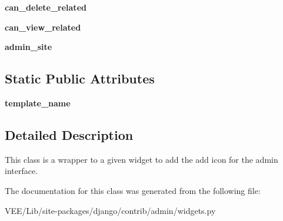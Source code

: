 \begin{DoxyCompactItemize}
{\bfseries can\+\_\+delete\+\_\+related}
\item 
\mbox{\label{classdjango_1_1contrib_1_1admin_1_1widgets_1_1_related_field_widget_wrapper_aa587863cdb1c004aea966f3668b40fe8}} 
{\bfseries can\+\_\+view\+\_\+related}
\item 
\mbox{\label{classdjango_1_1contrib_1_1admin_1_1widgets_1_1_related_field_widget_wrapper_a3b45ba41a9306a1a46a951c618e58e3b}} 
{\bfseries admin\+\_\+site}
\end{DoxyCompactItemize}
\subsection*{Static Public Attributes}
\begin{DoxyCompactItemize}
\item 
\mbox{\label{classdjango_1_1contrib_1_1admin_1_1widgets_1_1_related_field_widget_wrapper_a2dd08f514a692eeb3608c93a8a7a8538}} 
{\bfseries template\+\_\+name}
\end{DoxyCompactItemize}


\subsection{Detailed Description}
\begin{DoxyVerb}This class is a wrapper to a given widget to add the add icon for the
admin interface.
\end{DoxyVerb}
 

The documentation for this class was generated from the following file\+:\begin{DoxyCompactItemize}
\item 
V\+E\+E/\+Lib/site-\/packages/django/contrib/admin/widgets.\+py\end{DoxyCompactItemize}
